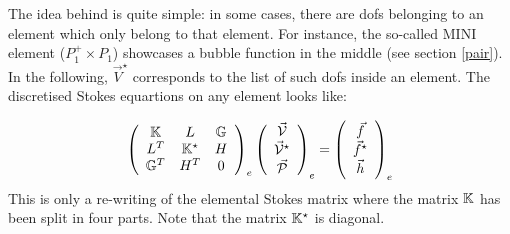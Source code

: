 
The idea behind  is quite simple: in some cases, there are dofs 
belonging to an element which only belong to that element. For instance, the so-called MINI 
element ($P_1^+ \times P_1$) showcases a bubble function in the middle (see section \ref{pair}). 
In the following, $\vec{V}^\star$ corresponds to the list of such dofs inside an element.
The discretised Stokes equartions on any element looks like:

\[
\left(
\begin{array}{ccc}
{\mathbb{K}}   & L & {\mathbb{G}} \\
L^T & {\mathbb{K}}^\star  & H \\
{\mathbb{G}}^T & H^T & 0
\end{array}
\right)_e
\left(
\begin{array}{c}
\vec{\cal V} \\ \vec{\cal V}^\star \\ \vec{\cal P}
\end{array}
\right)_e
=
\left(
\begin{array}{c}
\vec{f} \\ \vec{f}^\star \\ \vec{h}
\end{array}
\right)_e
\]
This is only a re-writing of the elemental Stokes matrix where the matrix ${\mathbb{K}}$ has been 
split in four parts.
Note that the matrix ${\mathbb{K}}^\star$ is diagonal.

